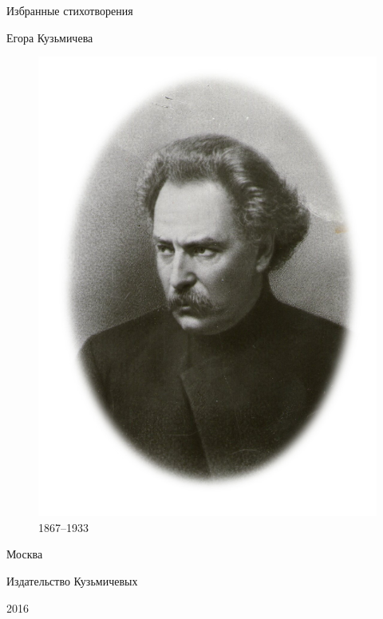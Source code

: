 \begin{titlepage}
  \begin{center}

\vfill

{\huge Избранные стихотворения}

\vskip 5pt
{\large Егора Кузьмичева}

\vspace*{0.5cm}
\begin{figure}[htp]
  \begin{center}
	  \includegraphics[scale=0.6]{images/kuzmichev_oval.pdf}
	  \caption*{1867--1933}
  \end{center}
\end{figure}

\vfill
{\small
Москва

Издательство Кузьмичевых

2016
}
\end{center}
\end{titlepage}

